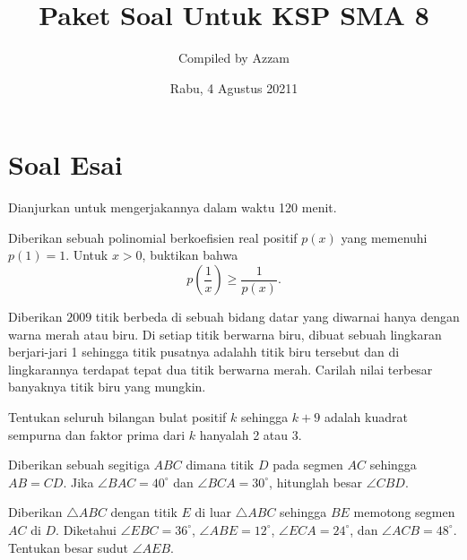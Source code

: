 \documentclass[12pt]{scrartcl}
\begin{document}
	\title{Paket Soal Untuk KSP SMA 8} %
	\date{Rabu, 4 Agustus 20211}
	\author{Compiled by Azzam}
	\maketitle

\renewcommand*\contentsname{Daftar Isi}
\tableofcontents

\newpage
	
	
	\section{Soal Esai}
	Dianjurkan untuk mengerjakannya dalam waktu 120 menit.
	
		
		
		\begin{soalbaru}
				Diberikan sebuah polinomial berkoefisien real positif $p(x)$ yang memenuhi $p(1)=1$. Untuk $x > 0$, buktikan bahwa $$p\left(\dfrac{1}{x}\right) \ge \dfrac{1}{p(x)}.$$
			\end{soalbaru}

	\begin{soalbaru}
		Diberikan $2009$ titik berbeda di sebuah bidang datar yang diwarnai hanya dengan warna merah atau biru. Di setiap titik berwarna biru, dibuat sebuah lingkaran berjari-jari 1 sehingga titik pusatnya adalahh titik biru tersebut dan di lingkarannya terdapat tepat dua titik berwarna merah. Carilah nilai terbesar banyaknya titik biru yang mungkin.
		
	\end{soalbaru}

	\begin{soalbaru}
		Tentukan seluruh bilangan bulat positif $k$ sehingga $k+9$ adalah kuadrat sempurna dan faktor prima dari $k$ hanyalah 2 atau 3.
		
	\end{soalbaru}

	
	\begin{soalbaru}
	
	Diberikan sebuah segitiga $ABC$ dimana titik $D$ pada segmen $AC$ sehingga $AB=CD$. Jika $\angle BAC = 40^\circ$ dan $\angle BCA = 30^\circ$, hitunglah besar $\angle CBD$.
	\end{soalbaru}

\begin{soalbaru} 
			Diberikan $\triangle ABC$ dengan titik $E$ di luar $\triangle ABC$ sehingga $BE$ memotong segmen $AC$ di $D$. Diketahui $\angle EBC = 36^\circ$, $\angle ABE = 12^\circ$, $\angle ECA = 24^\circ$, dan $\angle ACB = 48^\circ$. Tentukan besar sudut $\angle AEB$.
		\end{soalbaru}
	
\end{document}
